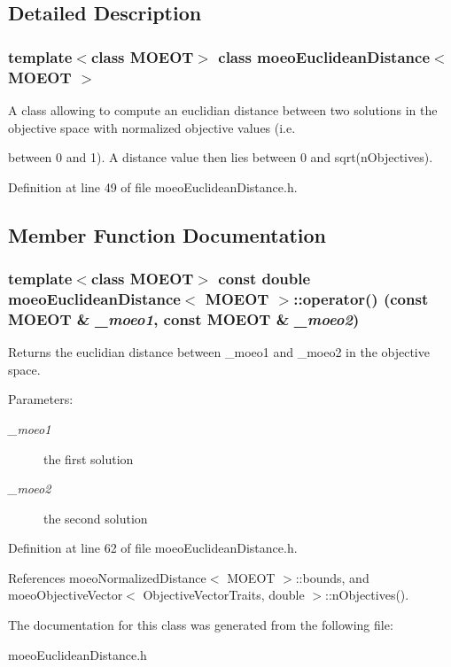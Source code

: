 \subsection{Detailed Description}
\subsubsection*{template$<$class MOEOT$>$ class moeo\-Euclidean\-Distance$<$ MOEOT $>$}

A class allowing to compute an euclidian distance between two solutions in the objective space with normalized objective values (i.e. 

between 0 and 1). A distance value then lies between 0 and sqrt(n\-Objectives). 



Definition at line 49 of file moeo\-Euclidean\-Distance.h.

\subsection{Member Function Documentation}
\subsubsection{\setlength{\rightskip}{0pt plus 5cm}template$<$class MOEOT$>$ const double \bf{moeo\-Euclidean\-Distance}$<$ MOEOT $>$::operator() (const MOEOT \& {\em \_\-moeo1}, const MOEOT \& {\em \_\-moeo2})\hspace{0.3cm}{\tt  [inline]}}\label{classmoeoEuclideanDistance_20ff559e95da92a46990eb0658f018f1}


Returns the euclidian distance between \_\-moeo1 and \_\-moeo2 in the objective space. 

\begin{Desc}
\item[Parameters:]
\begin{description}
\item[{\em \_\-moeo1}]the first solution \item[{\em \_\-moeo2}]the second solution \end{description}
\end{Desc}


Definition at line 62 of file moeo\-Euclidean\-Distance.h.

References moeo\-Normalized\-Distance$<$ MOEOT $>$::bounds, and moeo\-Objective\-Vector$<$ Objective\-Vector\-Traits, double $>$::n\-Objectives().

The documentation for this class was generated from the following file:\begin{CompactItemize}
\item 
moeo\-Euclidean\-Distance.h\end{CompactItemize}
